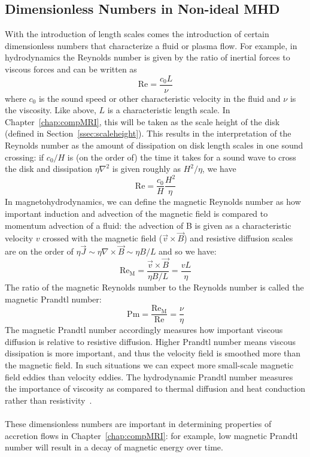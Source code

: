 \subsection{Dimensionless Numbers in Non-ideal MHD}
With the introduction of length scales comes the introduction of certain dimensionless numbers that characterize a fluid or plasma flow. For example, in hydrodynamics the Reynolds number is given by the ratio of inertial forces to viscous forces and can be written as
\begin{equation}
  \mathrm{Re}=\frac{c_0L}{\nu}
\end{equation}
where $c_0$ is the sound speed or other characteristic velocity in the fluid and $\nu$ is the viscosity. Like above, $L$ is a characteristic length scale. In Chapter~\ref{chap:compMRI}, this will be taken as the scale height of the disk (defined in Section~\ref{ssec:scaleheight}). This results in the interpretation of the Reynolds number as the amount of dissipation on disk length scales in one sound crossing: if $c_0/H$ is (on the order of) the time it takes for a sound wave to cross the disk and dissipation $\eta\nabla^2$ is given roughly as $H^2/\eta$, we have
\begin{equation}
  \mathrm{Re}=\frac{c_0}{H}\frac{H^2}{\eta}
\end{equation}
In magnetohydrodynamics, we can define the magnetic Reynolds number as how important induction and advection of the magnetic field is compared to momentum advection of a fluid: the advection of B is given as a characteristic velocity $v$ crossed with the magnetic field ($\vec v\times\vec B$) and resistive diffusion scales are on the order of $\eta\vec J\sim\eta\nabla\times\vec B\sim\eta B/L$ and so we have:
\begin{equation}
  \mathrm{Re_M}=\frac{\vec v\times\vec B}{\eta B/L}=\frac{vL}{\eta}
\end{equation}
The ratio of the magnetic Reynolds number to the Reynolds number is called the magnetic Prandtl number:
\begin{equation}
  \mathrm{Pm}=\frac{\mathrm{Re_M}}{\mathrm{Re}}=\frac\nu\eta
\end{equation}
The magnetic Prandtl number accordingly measures how important viscous diffusion is relative to resistive diffusion. Higher Prandtl number means viscous dissipation is more important, and thus the velocity field is smoothed more than the magnetic field. In such situations we can expect more small-scale magnetic field eddies than velocity eddies. The hydrodynamic Prandtl number measures the importance of viscosity as compared to thermal diffusion and heat conduction rather than resistivity~\cite{StoneLecture16.9.28}. \\
\\
These dimensionless numbers are important in determining properties of accretion flows in Chapter~\ref{chap:compMRI}: for example, low magnetic Prandtl number will result in a decay of magnetic energy over time. 
  
